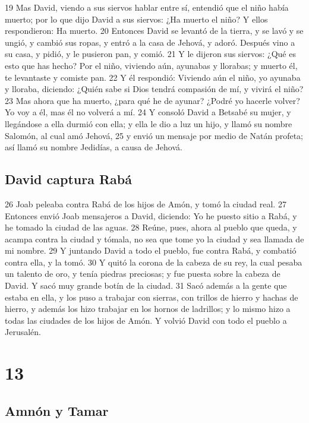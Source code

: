 19 Mas David, viendo a sus siervos hablar entre sí, entendió que el niño había muerto; por lo que dijo David a sus siervos: ¿Ha muerto el niño? Y ellos respondieron: Ha muerto.
20 Entonces David se levantó de la tierra, y se lavó y se ungió, y cambió sus ropas, y entró a la casa de Jehová, y adoró. Después vino a su casa, y pidió, y le pusieron pan, y comió.
21 Y le dijeron sus siervos: ¿Qué es esto que has hecho? Por el niño, viviendo aún, ayunabas y llorabas; y muerto él, te levantaste y comiste pan.
22 Y él respondió: Viviendo aún el niño, yo ayunaba y lloraba, diciendo: ¿Quién sabe si Dios tendrá compasión de mí, y vivirá el niño?
23 Mas ahora que ha muerto, ¿para qué he de ayunar? ¿Podré yo hacerle volver? Yo voy a él, mas él no volverá a mí.
24 Y consoló David a Betsabé su mujer, y llegándose a ella durmió con ella; y ella le dio a luz un hijo, y llamó su nombre Salomón, al cual amó Jehová,
25 y envió un mensaje por medio de Natán profeta; así llamó su nombre Jedidías, a causa de Jehová.
\section*{David captura Rabá}

 
26 Joab peleaba contra Rabá de los hijos de Amón, y tomó la ciudad real.
27 Entonces envió Joab mensajeros a David, diciendo: Yo he puesto sitio a Rabá, y he tomado la ciudad de las aguas.
28 Reúne, pues, ahora al pueblo que queda, y acampa contra la ciudad y tómala, no sea que tome yo la ciudad y sea llamada de mi nombre.
29 Y juntando David a todo el pueblo, fue contra Rabá, y combatió contra ella, y la tomó.
30 Y quitó la corona de la cabeza de su rey, la cual pesaba un talento de oro,  y tenía piedras preciosas; y fue puesta sobre la cabeza de David. Y sacó muy grande botín de la ciudad.
31 Sacó además a la gente que estaba en ella, y los puso a trabajar con sierras, con trillos de hierro y hachas de hierro, y además los hizo trabajar en los hornos de ladrillos; y lo mismo hizo a todas las ciudades de los hijos de Amón. Y volvió David con todo el pueblo a Jerusalén.

\chapter{13}

\section*{Amnón y Tamar}



